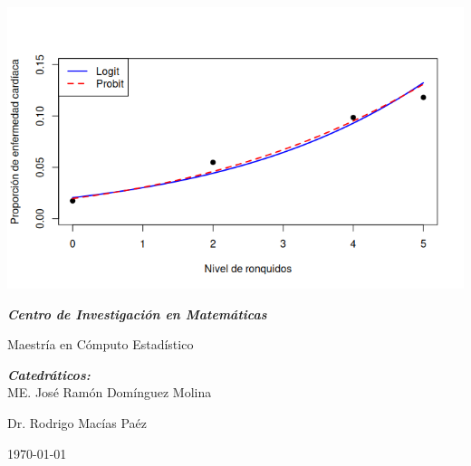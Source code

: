 \begin{titlepage}
\vspace{0.1cm}
\begin{center}
    \includegraphics[scale=0.6]{Images/logit-probit-p02.png}\par
    \vspace{1cm}
    {\textit{\bfseries\huge Centro de Investigación en Matemáticas}\par}
    \vspace{0.5cm}
    {\large Maestría en Cómputo Estadístico\par}
    \vspace{1cm}
\end{center}

\begin{center} \large
    {\emph{\textbf{Catedráticos:}}}\\
    \large ME. José Ramón Domínguez Molina\par
    \large Dr. Rodrigo Macías Paéz\par
    \vspace{0.3cm}
    \large \today
\end{center}

\end{titlepage}

